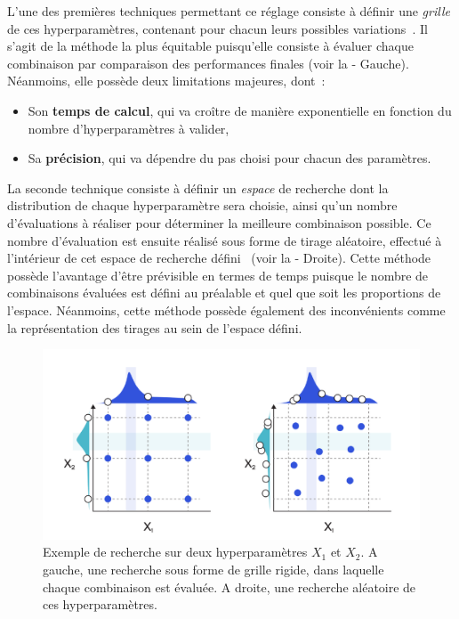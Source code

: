 L’une des premières techniques permettant ce réglage consiste à définir une \textit{grille} de ces hyperparamètres, contenant pour chacun leurs possibles variations~\cite{Liu2006}. Il s'agit de la méthode la plus équitable puisqu'elle consiste à évaluer chaque combinaison par comparaison des performances finales (voir la  - Gauche). Néanmoins, elle possède deux limitations majeures, dont~:
\begin{itemize}
    \item Son \textbf{temps de calcul}, qui va croître de manière exponentielle en fonction du nombre d'hyperparamètres à valider,
    \item Sa \textbf{précision}, qui va dépendre du pas choisi pour chacun des paramètres.
\end{itemize}\par

La seconde technique consiste à définir un \textit{espace} de recherche dont la distribution de chaque hyperparamètre sera choisie, ainsi qu'un nombre d'évaluations à réaliser pour déterminer la meilleure combinaison possible. Ce nombre d'évaluation est ensuite réalisé sous forme de tirage aléatoire, effectué à l'intérieur de cet espace de recherche défini~\cite{bergstra2012} (voir la  - Droite). Cette méthode possède l'avantage d'être prévisible en termes de temps puisque le nombre de combinaisons évaluées est défini au préalable et quel que soit les proportions de l'espace. Néanmoins, cette méthode possède également des inconvénients comme la représentation des tirages au sein de l'espace défini.

\begin{figure}[H]
    \centering
    \includegraphics[width=\linewidth]{contents/chapter_3/resources/example_hyperparameter_selection.pdf}
    \caption{Exemple de recherche sur deux hyperparamètres $X_1$ et $X_2$. A gauche, une recherche sous forme de grille rigide, dans laquelle chaque combinaison est évaluée. A droite, une recherche aléatoire de ces hyperparamètres.}
    \label{fig:example_hyperparameter_selection}
\end{figure}

